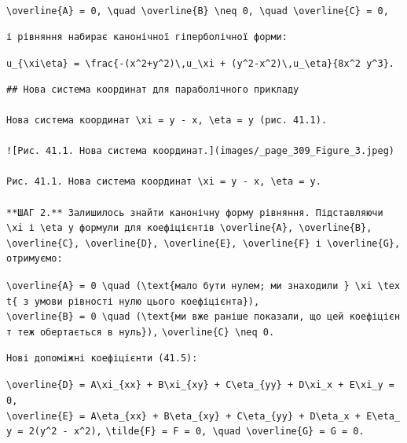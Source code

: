 \documentclass[
  ukrainian,
]{article}
\begin{document}
\texttt{\textbackslash{}overline\{A\}\ =\ 0,\ \textbackslash{}quad\ \textbackslash{}overline\{B\}\ \textbackslash{}neq\ 0,\ \textbackslash{}quad\ \textbackslash{}overline\{C\}\ =\ 0,}

\begin{verbatim}
і рівняння набирає канонічної гіперболічної форми:
\end{verbatim}

\texttt{u\_\{\textbackslash{}xi\textbackslash{}eta\}\ =\ \textbackslash{}frac\{-(x\^{}2+y\^{}2)\textbackslash{},u\_\textbackslash{}xi\ +\ (y\^{}2-x\^{}2)\textbackslash{},u\_\textbackslash{}eta\}\{8x\^{}2\ y\^{}3\}.}

\begin{verbatim}
## Нова система координат для параболічного прикладу

Нова система координат \xi = y - x, \eta = y (рис. 41.1).

![Рис. 41.1. Нова система координат.](images/_page_309_Figure_3.jpeg)

Рис. 41.1. Нова система координат \xi = y - x, \eta = y.

**ШАГ 2.** Залишилось знайти канонічну форму рівняння. Підставляючи \xi і \eta у формули для коефіцієнтів \overline{A}, \overline{B}, \overline{C}, \overline{D}, \overline{E}, \overline{F} і \overline{G}, отримуємо:
\end{verbatim}

\texttt{\textbackslash{}overline\{A\}\ =\ 0\ \textbackslash{}quad\ (\textbackslash{}text\{мало\ бути\ нулем;\ ми\ знаходили\ \}\ \textbackslash{}xi\ \textbackslash{}text\{\ з\ умови\ рівності\ нулю\ цього\ коефіцієнта\}),}
\texttt{\textbackslash{}overline\{B\}\ =\ 0\ \textbackslash{}quad\ (\textbackslash{}text\{ми\ вже\ раніше\ показали,\ що\ цей\ коефіцієнт\ теж\ обертається\ в\ нуль\}),}
\texttt{\textbackslash{}overline\{C\}\ \textbackslash{}neq\ 0.}

\begin{verbatim}
Нові допоміжні коефіцієнти (41.5):
\end{verbatim}

\texttt{\textbackslash{}overline\{D\}\ =\ A\textbackslash{}xi\_\{xx\}\ +\ B\textbackslash{}xi\_\{xy\}\ +\ C\textbackslash{}eta\_\{yy\}\ +\ D\textbackslash{}xi\_x\ +\ E\textbackslash{}xi\_y\ =\ 0,}
\texttt{\textbackslash{}overline\{E\}\ =\ A\textbackslash{}eta\_\{xx\}\ +\ B\textbackslash{}eta\_\{xy\}\ +\ C\textbackslash{}eta\_\{yy\}\ +\ D\textbackslash{}eta\_x\ +\ E\textbackslash{}eta\_y\ =\ 2(y\^{}2\ -\ x\^{}2),}
\texttt{\textbackslash{}tilde\{F\}\ =\ F\ =\ 0,\ \textbackslash{}quad\ \textbackslash{}overline\{G\}\ =\ G\ =\ 0.}
\end{document}
